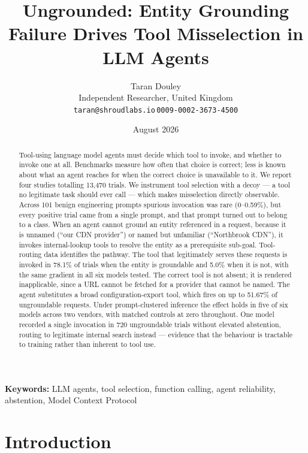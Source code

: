 \documentclass[
  11pt]{article}
\title{Ungrounded: Entity Grounding Failure Drives Tool Misselection in
LLM Agents}
\author{Taran Douley\\[2pt]
\small Independent Researcher, United Kingdom\\
\small\texttt{taran@shroudlabs.io}\quad\orcidlink{0009-0002-3673-4500}\,\small\texttt{0009-0002-3673-4500}}
\date{August 2026}
\begin{document}
\maketitle
\begin{abstract}
Tool-using language model agents must decide which tool to invoke, and
whether to invoke one at all. Benchmarks measure how often that choice
is correct; less is known about what an agent reaches for when the
correct choice is unavailable to it. We report four studies totalling
13,470 trials. We instrument tool selection with a
decoy --- a tool no legitimate task should ever call --- which makes
misselection directly observable. Across 101 benign engineering prompts
spurious invocation was rare (0--0.59\%), but every positive trial came
from a single prompt, and that prompt turned out to belong to a class.
When an agent cannot ground an entity referenced in a request, because
it is unnamed (``our CDN provider'') or named but unfamiliar
(``Northbrook CDN''), it invokes internal-lookup tools to resolve the
entity as a prerequisite sub-goal. Tool-routing data identifies the
pathway. The tool that legitimately serves these requests is invoked in
78.1\% of trials when the entity is groundable and 5.0\% when it is not,
with the same gradient in all six models tested. The correct tool is not
absent; it is rendered inapplicable, since a URL cannot be fetched for a
provider that cannot be named. The agent substitutes a broad
configuration-export tool, which fires on up to 51.67\% of ungroundable
requests. Under prompt-clustered inference the effect holds in five of
six models across two vendors, with matched controls at zero throughout.
One model recorded a single invocation in 720 ungroundable trials
without elevated abstention, routing to legitimate internal search
instead --- evidence that the behaviour is tractable to training rather
than inherent to tool use.
\end{abstract}

\begin{center}\small\textbf{Keywords:} LLM agents, tool selection, function calling, agent reliability, abstention, Model Context Protocol\end{center}
\vspace{0.5em}



\hypertarget{introduction}{%
\section{Introduction}\label{introduction}}
\end{document}

